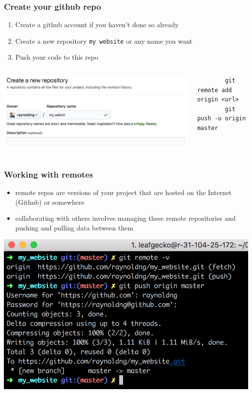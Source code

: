 \documentclass[12pt]{beamer}
\begin{document}
\begin{frame}[fragile]
\frametitle{Create your github repo}
\begin{enumerate}
	\item Create a github account if you haven't done so already
	\item Create a new repository \texttt{my website} or any name you want
	\item Push your code to this repo
\end{enumerate}
\begin{columns}
	\begin{column}{0.5\linewidth}
		\includegraphics[width=\linewidth]{new_github_repo}
	\end{column}
	\begin{column}{0.5\linewidth}
		\tiny
		\begin{verbatim}
		git remote add origin <url>
		git push -u origin master
		\end{verbatim}
	\end{column}
\end{columns}
\end{frame}

\begin{frame}
\frametitle{Working with remotes}
\begin{itemize}
	\item remote repos are versions of your project that are hosted on the Internet (Github) or somewhere
	\item collaborating with others involves managing these remote repositories and pushing and pulling data between them
\end{itemize}
\begin{center}
	\includegraphics[width=0.8\linewidth]{git_remote}
\end{center}
\end{frame}
\end{document}
